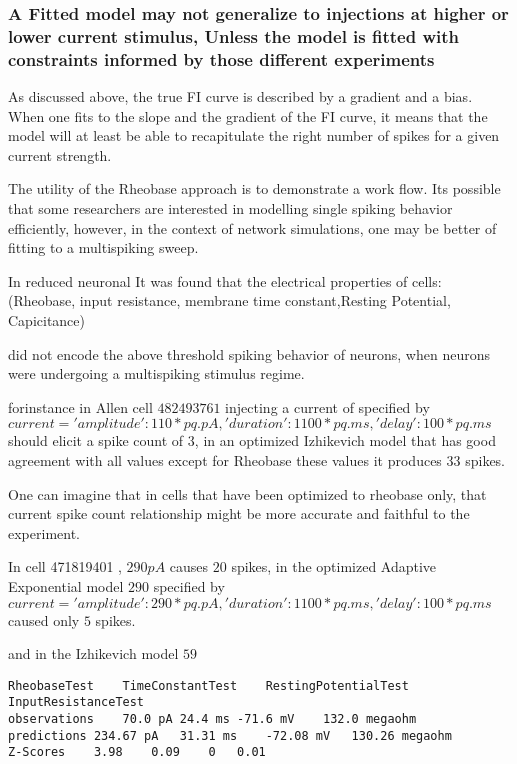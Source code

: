\subsubsection{A Fitted model may not generalize to injections at higher or lower current stimulus, Unless the model is fitted with constraints informed by those different experiments}
As discussed above, the true FI curve is described by a gradient and a bias. When one fits to the slope and the gradient of the FI curve, it means that the model will at least be able to recapitulate the right number of spikes for a given current strength. 

%

The utility of the Rheobase approach is to demonstrate a work flow. Its possible that some researchers are interested in modelling single spiking behavior efficiently, however, in the context of network simulations, one may be better of fitting to a multispiking sweep.

In reduced neuronal It was found that the electrical properties of cells:
 (Rheobase, input resistance, membrane time constant,Resting Potential, Capicitance)

 did not encode the above threshold spiking behavior of neurons, when neurons were undergoing a multispiking stimulus regime.

 forinstance in Allen cell $482493761$ injecting a current of 
 specified by $ current = {'amplitude':110*pq.pA,'duration':1100*pq.ms,'delay':100*pq.ms} $
 should elicit a spike count of $3$, in an optimized Izhikevich model that has good agreement with all values except for Rheobase these values it produces $33$ spikes.

One can imagine that in cells that have been optimized to rheobase only, that current spike count relationship might be more  accurate and faithful to the experiment.

In cell 471819401 , $290 pA$ causes $20$ spikes,
in the optimized Adaptive Exponential model $290$
specified by $ current = {'amplitude':290*pq.pA,'duration':1100*pq.ms,'delay':100*pq.ms} $
caused only $5$ spikes. 

and in the Izhikevich model $59$

\begin{verbatim}
RheobaseTest	TimeConstantTest	RestingPotentialTest	InputResistanceTest
observations	70.0 pA	24.4 ms	-71.6 mV	132.0 megaohm
predictions	234.67 pA	31.31 ms	-72.08 mV	130.26 megaohm
Z-Scores	3.98	0.09	0	0.01
\end{verbatim}

